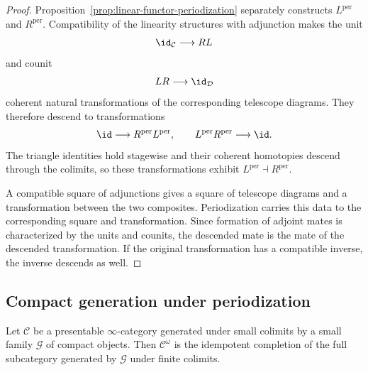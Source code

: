 \begin{proof}
Proposition~\ref{prop:linear-functor-periodization} separately constructs $L^{\mathrm{per}}$ and
$R^{\mathrm{per}}$.  Compatibility of the linearity structures with adjunction makes the unit
\[
    \id_{\mathcal C}\longrightarrow RL
\]
and counit
\[
    LR\longrightarrow\id_{\mathcal D}
\]
coherent natural transformations of the corresponding telescope diagrams.  They therefore descend
to transformations
\[
    \id\longrightarrow R^{\mathrm{per}}L^{\mathrm{per}},
    \qquad
    L^{\mathrm{per}}R^{\mathrm{per}}\longrightarrow\id.
\]
The triangle identities hold stagewise and their coherent homotopies descend through the colimits,
so these transformations exhibit $L^{\mathrm{per}}\dashv R^{\mathrm{per}}$.

A compatible square of adjunctions gives a square of telescope diagrams and a transformation between
the two composites.  Periodization carries this data to the corresponding square and transformation.
Since formation of adjoint mates is characterized by the units and counits, the descended mate is the
mate of the descended transformation.  If the original transformation has a compatible inverse, the
inverse descends as well.
\end{proof}

\subsection{Compact generation under periodization}

\begin{lemma}
\label{lem:compact-closure-generators}
Let \(\mathcal C\) be a presentable \(\infty\)-category generated under small
colimits by a small family \(\mathcal G\) of compact objects.  Then
\(\mathcal C^\omega\) is the idempotent completion of the full subcategory
generated by \(\mathcal G\) under finite colimits.
\end{lemma}

